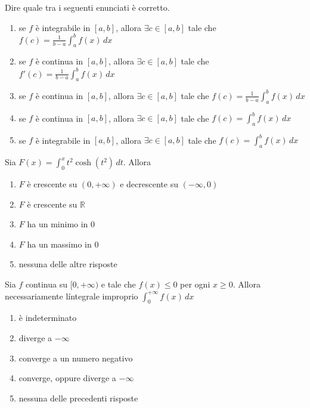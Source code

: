 \begin{quiz}
Dire quale tra i seguenti enunciati \`e corretto.
\begin{enumerate}
\item se $f$ \`e integrabile in $[a,b]$, allora $\exists c\in[a,b]$ tale che $f(c)=\frac1{b-a}\int_a^b f(x)\,dx$
\item se $f$ \`e continua in $[a,b]$, allora $\exists c\in[a,b]$ tale che $f\prime(c)=\frac1{b-a}\int_a^b f(x)\,dx$
\item se $f$ \`e continua in $[a,b]$, allora $\exists c\in[a,b]$ tale che $f(c)=\frac1{b-a}\int_a^b f(x)\,dx$
\item se $f$ \`e continua in $[a,b]$, allora $\exists c\in[a,b]$ tale che $f(c)=\int_a^b f(x)\,dx$
\item se $f$ \`e integrabile in $[a,b]$, allora $\exists c\in[a,b]$ tale che $f(c)=\int_a^b f(x)\,dx$
\end{enumerate}
\end{quiz}

\begin{quiz}
Sia $F(x)=\int_0^x t^2\cosh(t^2)\,dt$. Allora
\begin{enumerate}
\item $F$ \`e crescente su $(0,+\infty)$ e decrescente su $(-\infty,0)$
\item $F$ \`e crescente su $\mathbb R$
\item $F$ ha un minimo in $0$
\item $F$ ha un massimo in $0$
\item nessuna delle altre risposte
\end{enumerate}
\end{quiz}

\begin{quiz}
Sia $f$ continua su $[0,+\infty)$ e tale che $f(x)\le0$ per ogni $x\ge0$. Allora necessariamente l\'integrale improprio $\int_0^{+\infty}f(x)\,dx$
\begin{enumerate}
\item \`e indeterminato
\item diverge a $-\infty$
\item converge a un numero negativo
\item converge, oppure diverge a $-\infty$
\item nessuna delle precedenti risposte
\end{enumerate}
\end{quiz}

